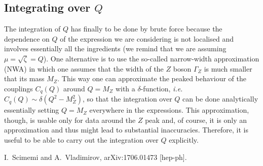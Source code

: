 \documentclass[10pt,a4paper]{article}
\begin{document}
\subsection{Integrating over $Q$}

The integration of $Q$ has finally to be done by brute force because
the dependence on $Q$ of the expression we are considering is not
localised and involves essentially all the ingredients (we remind that
we are assuming $\mu=\sqrt{\zeta}=Q$). One alternative is to use the
so-called narrow-width approximation (NWA) in which one assumes that
the width of the $Z$ boson $\Gamma_Z$ is much smaller that its mass
$M_Z$. This way one can approximate the peaked behaviour of the
couplings $C_q(Q)$ around $Q=M_Z$ with a $\delta$-function,
\textit{i.e.} $C_q(Q)\sim \delta(Q^2-M_Z^2)$, so that the integration
over $Q$ can be done analytically essentially setting $Q=M_Z$
everywhere in the expressions. This approximation, though, is usable
only for data around the $Z$ peak and, of course, it is only an
approximation and thus might lead to substantial
inaccuracies. Therefore, it is useful to be able to carry out the
integration over $Q$ explicitly.


\begin{thebibliography}{alp}

  I.~Scimemi and A.~Vladimirov,
  arXiv:1706.01473 [hep-ph].

\end{thebibliography}
\end{document}
